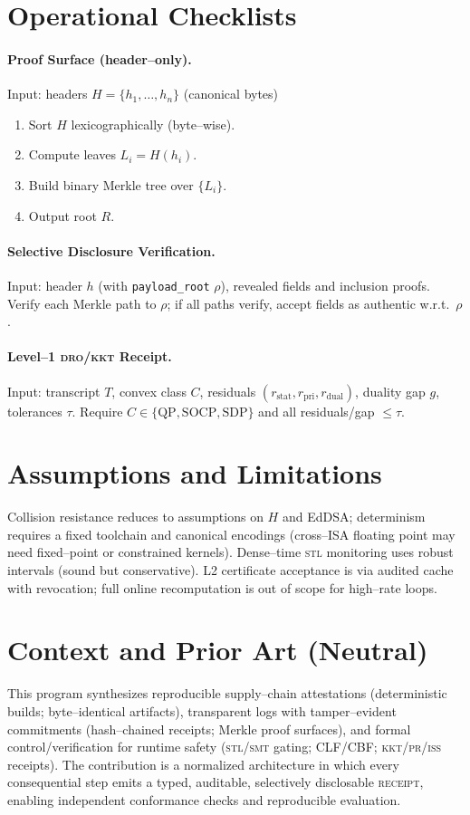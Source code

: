 \documentclass[11pt]{article}
\theoremstyle{plain}
\theoremstyle{remark}
\newcommand{\code}[1]{\texttt{#1}}
\newcommand{\receipt}{\textsc{receipt}}
\newcommand{\stl}{\textsc{stl}}
\newcommand{\smt}{\textsc{smt}}
\newcommand{\iss}{\textsc{iss}}
\newcommand{\pr}{\textsc{pr}}
\newcommand{\dro}{\textsc{dro}}
\newcommand{\kkt}{\textsc{kkt}}
\begin{document}
\section{Operational Checklists}
\label{sec:checklists}
\paragraph{Proof Surface (header--only).}
Input: headers $H=\{h_1,\dots,h_n\}$ (canonical bytes)
\begin{enumerate}[nosep]
  \item Sort $H$ lexicographically (byte--wise).
  \item Compute leaves $L_i=H(h_i)$.
  \item Build binary Merkle tree over $\{L_i\}$.
  \item Output root $R$.
\end{enumerate}

\paragraph{Selective Disclosure Verification.}
Input: header $h$ (with \code{payload\_root} $\rho$), revealed fields and inclusion proofs. Verify each Merkle path to $\rho$; if all paths verify, accept fields as authentic w.r.t.\ $\rho$.

\paragraph{Level--1 \dro/\kkt{} Receipt.}
Input: transcript $T$, convex class $C$, residuals $(r_{\text{stat}},r_{\text{pri}},r_{\text{dual}})$, duality gap $g$, tolerances $\tau$. Require $C\in\{\text{QP},\text{SOCP},\text{SDP}\}$ and all residuals/gap $\le \tau$.

\section{Assumptions and Limitations}
\label{sec:limits}
Collision resistance reduces to assumptions on $H$ and EdDSA; determinism requires a fixed toolchain and canonical encodings (cross--ISA floating point may need fixed--point or constrained kernels). Dense--time \stl{} monitoring uses robust intervals (sound but conservative).
L2 certificate acceptance is via audited cache with revocation; full online recomputation is out of scope for high--rate loops.

\section{Context and Prior Art (Neutral)}
\label{sec:context}
This program synthesizes reproducible supply--chain attestations (deterministic builds; byte--identical artifacts), transparent logs with tamper--evident commitments (hash--chained receipts; Merkle proof surfaces), and formal control/verification for runtime safety (\stl/\smt{} gating; CLF/CBF; \kkt/\pr/\iss{} receipts). The contribution is a normalized architecture in which every consequential step emits a typed, auditable, selectively disclosable \receipt{}, enabling independent conformance checks and reproducible evaluation.
\end{document}

